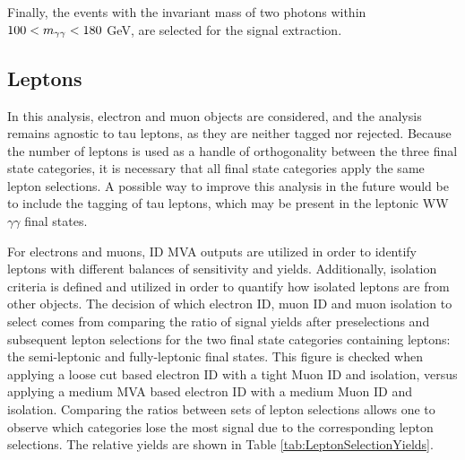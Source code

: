 Finally, the events with the invariant mass of two photons within $100 < m_{\gamma\gamma} < 180$ GeV, are selected for the signal extraction.

\subsection{Leptons} \label{sec:LeptonSelections}

In this analysis, electron and muon objects are considered, and the analysis remains agnostic to tau leptons, as they are neither tagged nor rejected. Because the number of leptons is used as a handle of orthogonality between the three final state categories, it is necessary that all final state categories apply the same lepton selections. A possible way to improve this analysis in the future would be to include the tagging of tau leptons, which may be present in the leptonic WW$\gamma\gamma$ final states. 

For electrons and muons, ID MVA outputs are utilized in order to identify leptons with different balances of sensitivity and yields. Additionally, isolation criteria is defined and utilized in order to quantify how isolated leptons are from other objects. The decision of which electron ID, muon ID and muon isolation to select comes from comparing the ratio of signal yields after preselections and subsequent lepton selections for the two final state categories containing leptons: the semi-leptonic and fully-leptonic final states. This figure is checked
when applying a loose cut based electron ID with a tight Muon ID and isolation, versus applying a medium MVA based electron ID with a medium Muon ID and isolation. Comparing the ratios between sets of lepton
selections allows one to observe which categories lose the most signal due to the corresponding lepton selections. The relative yields are shown in Table \ref{tab:LeptonSelectionYields}.

